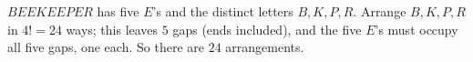 $BEEKEEPER$ has five $E$'s and the distinct letters $B,K,P,R$. Arrange $B,K,P,R$ in $4!=24$ ways; this leaves $5$ gaps (ends included), and the five $E$'s must occupy all five gaps, one each. So there are $\boxed{24}$ arrangements.
